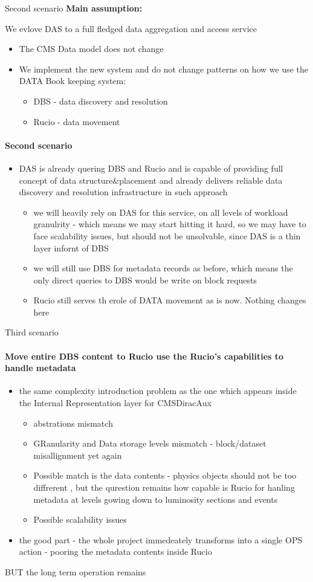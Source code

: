 \documentclass{beamer}
\begin{document}
\begin{frame}{Second scenario}
\medskip
\textbf{Main assumption:}

We evlove DAS to a full fledged data aggregation and access service

\begin{itemize}
\item The CMS Data model does not change
\item We implement the new system and do not change patterns on how we use the DATA Book keeping system:
\begin{itemize}
\item DBS - data discovery and resolution
\item Rucio - data movement
\end{itemize}
\end{itemize}
\framesubtitle{Second scenario}
\begin{itemize}
\item DAS is already quering DBS and Rucio and is capable of providing full concept of data structure\&placement and already delivers reliable data discovery and resolution infrastructure in such approach
\begin{itemize}
\item we will heavily rely on DAS for this service, on all levels of workload granulrity - which means we  may start hitting it hard, so we may have to face scalability issues, but should not be unsolvable, since DAS is a thin layer infornt of DBS
\item we will still use DBS for metadata records as before, which means the only direct queries to DBS would be write on block requests
\item Rucio still serves th erole of DATA movement as is now. Nothing changes here
\end{itemize}
\end{itemize}
\end{frame}
\begin{frame}{Third scenario}
\framesubtitle{Move entire DBS content to Rucio use the Rucio's capabilities to handle metadata}
\begin{itemize}
\item the same complexity introduction problem as the one which appears inside the Internal Representation layer for CMSDiracAux    
\begin{itemize}
\item abstrations mismatch
\item GRanularity and Data storage levels mismatch - block/dataset misallignment yet again
\item Possible match is the data contents - physics objects  should not be too diffrerent , but the qurestion remains how capable is Rucio for hanling metadata at levels gowing down to luminosity sections and events
\item Possible scalability issues
\end{itemize}
\item the good part - the whole project immedeately transforms into a single OPS action - pooring the metadata  contents inside Rucio
\end{itemize}
BUT the long term operation remains

\end{frame}
\end{document}
